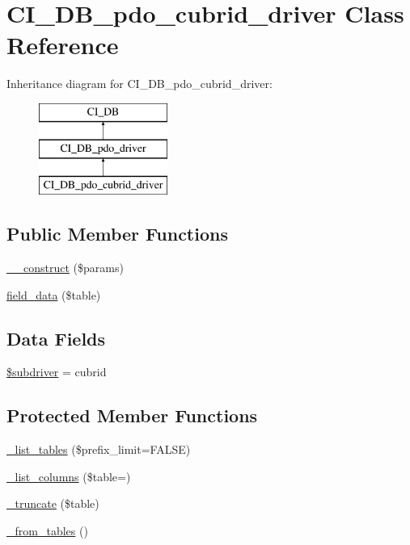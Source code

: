 \hypertarget{class_c_i___d_b__pdo__cubrid__driver}{}\section{C\+I\+\_\+\+D\+B\+\_\+pdo\+\_\+cubrid\+\_\+driver Class Reference}
\label{class_c_i___d_b__pdo__cubrid__driver}
Inheritance diagram for C\+I\+\_\+\+D\+B\+\_\+pdo\+\_\+cubrid\+\_\+driver\+:\begin{figure}[H]
\begin{center}
\leavevmode
\includegraphics[height=3.000000cm]{class_c_i___d_b__pdo__cubrid__driver}
\end{center}
\end{figure}
\subsection*{Public Member Functions}
\begin{DoxyCompactItemize}
\item 
\mbox{\hyperlink{class_c_i___d_b__pdo__cubrid__driver_a9162320adff1a1a4afd7f2372f753a3e}{\+\_\+\+\_\+construct}} (\$params)
\item 
\mbox{\hyperlink{class_c_i___d_b__pdo__cubrid__driver_a90355121e1ed009e0efdbd544ab56efa}{field\+\_\+data}} (\$table)
\end{DoxyCompactItemize}
\subsection*{Data Fields}
\begin{DoxyCompactItemize}
\item 
\mbox{\hyperlink{class_c_i___d_b__pdo__cubrid__driver_a1322ca756348b11d080cb7a4f590de15}{\$subdriver}} = \textquotesingle{}cubrid\textquotesingle{}
\end{DoxyCompactItemize}
\subsection*{Protected Member Functions}
\begin{DoxyCompactItemize}
\item 
\mbox{\hyperlink{class_c_i___d_b__pdo__cubrid__driver_a435c0f3ce54fe7daa178baa8532ebd54}{\+\_\+list\+\_\+tables}} (\$prefix\+\_\+limit=F\+A\+L\+SE)
\item 
\mbox{\hyperlink{class_c_i___d_b__pdo__cubrid__driver_a7ccb7f9c301fe7f0a9db701254142b63}{\+\_\+list\+\_\+columns}} (\$table=\textquotesingle{}\textquotesingle{})
\item 
\mbox{\hyperlink{class_c_i___d_b__pdo__cubrid__driver_aa029600528fc1ce660a23ff4b4667f95}{\+\_\+truncate}} (\$table)
\item 
\mbox{\hyperlink{class_c_i___d_b__pdo__cubrid__driver_aef43f7e3e7b71d337ff3724c5eb14f10}{\+\_\+from\+\_\+tables}} ()
\end{DoxyCompactItemize}
